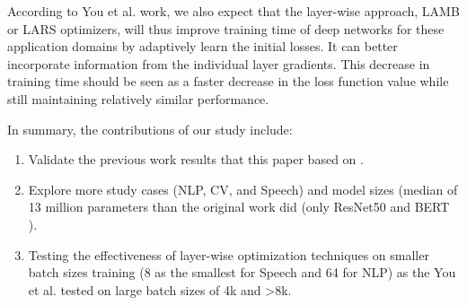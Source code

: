 According to You et al. \cite{ginsburg2018large, You2020Large} work, we also expect that the layer-wise approach, LAMB or LARS optimizers, will thus improve training time of deep networks for these application domains by adaptively learn the initial losses. It can better incorporate information from the individual layer gradients. This decrease in training time should be seen as a faster decrease in the loss function value while still maintaining relatively similar performance.


In summary, the contributions of our study include:
\begin{enumerate}
    \item Validate the previous work results that this paper based on \cite{ginsburg2018large,You2020Large}.
    \item Explore more study cases (NLP, CV, and Speech) and model sizes (median of 13 million parameters than the original work did (only ResNet50 \cite{resnet} and BERT \cite{bert}). 
    \item Testing the effectiveness of layer-wise optimization techniques on smaller batch sizes training (8 as the smallest for Speech and 64 for NLP)  as the You et al. tested on large batch sizes of {4k and >8k}.
\end{enumerate}












